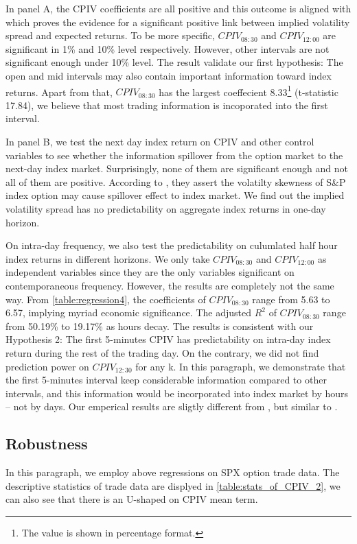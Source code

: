 In panel A, the CPIV coefficients are all positive and this outcome is aligned with \textcite{cremers2010deviations} which proves the evidence for a significant positive link between implied volatility spread and expected returns. To be more specific, $CPIV_{08:30}$ and $CPIV_{12:00}$ are significant in 1\% and 10\% level respectively. However, other intervals are not significant enough under 10\% level. The result validate our first hypothesis: The open and mid intervals may also contain important information toward index returns. Apart from that, $CPIV_{08:30}$ has the largest coeffecient 8.33\footnote{The value is shown in percentage format.} (t-statistic 17.84), we believe that most trading information is incoporated into the first interval.

In panel B, we test the next day index return on CPIV and other control variables to see whether the information spillover from the option market to the next-day index market. Surprisingly, none of them are significant enough and not all of them are positive. According to \textcite{atilgan2015implied}, they assert the volatilty skewness of S\&P index option may cause spillover effect to index market. We find out the implied volatility spread has no predictability on aggregate index returns in one-day horizon.

On intra-day frequency, we also test the predictability on culumlated half hour index returns in different horizons. We only take $CPIV_{08:30}$ and $CPIV_{12:00}$ as independent variables since they are the only variables significant on contemporaneous frequency. However, the results are completely not the same way. From \autoref{table:regression4}, the coefficients of $CPIV_{08:30}$ range from 5.63 to 6.57, implying myriad economic significance. The adjusted $R^{2}$ of $CPIV_{08:30}$ range from 50.19\% to 19.17\% as hours decay. The results is consistent with our Hypothesis 2: The first 5-minutes CPIV has predictability on intra-day index return during the rest of the trading day. On the contrary, we did not find prediction power on $CPIV_{12:30}$ for any k. In this paragraph, we demonstrate that the first 5-minutes interval keep considerable information compared to other intervals, and this information would be incorporated into index market by hours -- not by days. Our emperical results are sligtly different from \textcite{cremers2010deviations}, but similar to \textcite{kumar1992behavior}. 
   
\subsection{Robustness}
In this paragraph, we employ above regressions on SPX option trade data. The descriptive statistics of trade data are displyed in \autoref{table:stats_of_CPIV_2}, we can also see that there is an U-shaped on CPIV mean term.   
   




